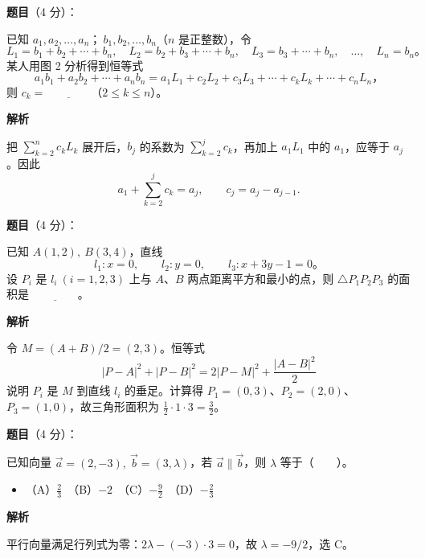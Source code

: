 \begin{answer}

\textbf{题目}（4 分）：

已知 \(a_1,a_2,\ldots,a_n\text{；}\ b_1,b_2,\ldots,b_n\)（\(n\) 是正整数），令
\nopagebreak[4]
\[
L_1=b_1+b_2+\cdots+b_n,\quad L_2=b_2+b_3+\cdots+b_n,\quad
L_3=b_3+\cdots+b_n,\quad\ldots,\quad L_n=b_n\text{。}
\]
某人用图 2 分析得到恒等式
\nopagebreak[4]
\[
a_1b_1+a_2b_2+\cdots+a_nb_n
=a_1L_1+c_2L_2+c_3L_3+\cdots+c_kL_k+\cdots+c_nL_n\text{，}
\]
则 \(c_k=\underline{\qquad\qquad}\)（\(2\le k\le n\)）。
\nopagebreak[4]
\begin{center}\end{center}
\nopagebreak[4]
\textbf{解析}

把 $\sum_{k=2}^n c_kL_k$ 展开后，$b_j$ 的系数为 $\sum_{k=2}^j c_k$，再加上 $a_1L_1$ 中的 $a_1$，应等于 $a_j$。因此
\nopagebreak[4]
\[
a_1+\sum_{k=2}^j c_k=a_j,
\qquad c_j=a_j-a_{j-1}.
\]


\end{answer}
\begin{answer}

\textbf{题目}（4 分）：

已知 \(A(1,2),\ B(3,4)\)，直线
\nopagebreak[4]
\[
l_1:x=0,\qquad l_2:y=0,\qquad l_3:x+3y-1=0\text{。}
\]
设 \(P_i\) 是 \(l_i\ (i=1,2,3)\) 上与 \(A\text{、}B\) 两点距离平方和最小的点，则 \(\triangle P_1P_2P_3\) 的面积是 \(\underline{\qquad\qquad}\)。

\textbf{解析}

令 $M=(A+B)/2=(2,3)$。恒等式
\nopagebreak[4]
\[
|P-A|^2+|P-B|^2=2|P-M|^2+\frac{|A-B|^2}{2}
\]
说明 $P_i$ 是 $M$ 到直线 $l_i$ 的垂足。计算得 $P_1=(0,3)$、$P_2=(2,0)$、$P_3=(1,0)$，故三角形面积为 $\frac12\cdot1\cdot3=\frac32$。


\end{answer}
\begin{answer}

\textbf{题目}（4 分）：

已知向量 \(\vec a=(2,-3),\ \vec b=(3,\lambda)\)，若 \(\vec a\parallel\vec b\)，则 \(\lambda\) 等于\mbox{（　　）}。

\begin{itemize}
\item （A）\(\frac23\)　（B）\(-2\)　（C）\(-\frac92\)　（D）\(-\frac23\)
\end{itemize}

\textbf{解析}

平行向量满足行列式为零：$2\lambda-(-3)\cdot3=0$，故 $\lambda=-9/2$，选 C。


\end{answer}
